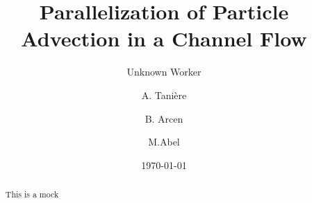 \documentclass[aps,prl,twocolumn,showpacs,superscriptaddress,groupedaddress]{revtex4}  %
\begin{document}


\title{Parallelization of Particle Advection in a Channel Flow}
\author{Unknown Worker}
\author{A. Tani\`ere}
\author{B. Arcen}
\author{M.Abel}
\date{\today}


\begin{abstract}
This is a mock
\end{abstract}

\pacs{}
\maketitle
\end{document}

